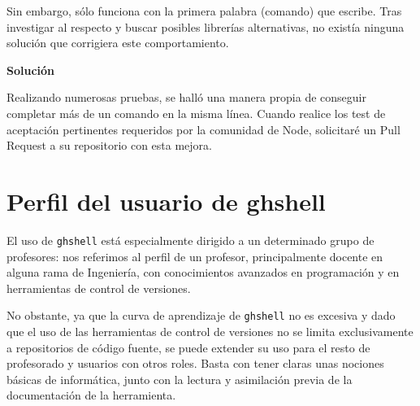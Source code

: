 Sin embargo, sólo funciona con la primera palabra (comando) que escribe. Tras investigar al respecto y buscar posibles librerías alternativas, no existía ninguna solución que corrigiera este comportamiento.
\bigskip

{\normalsize {\bfseries Solución}}
\bigskip

Realizando numerosas pruebas, se halló una manera propia de conseguir completar más de un comando en la misma línea. Cuando realice los test de aceptación pertinentes requeridos por la comunidad de Node, solicitaré un Pull Request a su repositorio con esta mejora.


\section{Perfil del usuario de ghshell}
\label{3:sec:4}

El uso de \verb|ghshell| está especialmente dirigido a un determinado grupo de profesores: nos referimos al perfil de un profesor, principalmente docente en alguna rama de Ingeniería, con conocimientos avanzados en programación y en herramientas de control de versiones.

No obstante, ya que la curva de aprendizaje de \verb|ghshell| no es excesiva y dado que el uso de las herramientas de control de versiones no se limita exclusivamente a repositorios de código fuente, se puede extender su uso para el resto de profesorado y usuarios con otros roles. Basta con tener claras unas nociones básicas de informática, junto con la lectura y asimilación previa de la documentación de la herramienta.
